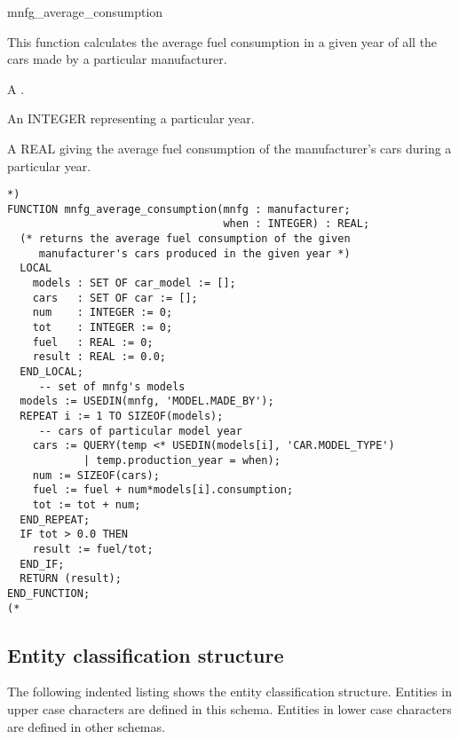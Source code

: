 \documentclass{article}
\begin{document}
\begin{Mnamedesc}{mnfg_average_consumption}
\begin{Mdesctext}
    This function calculates the average fuel consumption in a given year
of all the cars made by a particular manufacturer.
\end{Mdesctext}

\begin{Ipars}

\item[mnfg:] A .

\item[when:] An INTEGER representing a particular year.

\item[RESULT:] A REAL giving the average fuel consumption of the manufacturer's
cars during a particular year.
\end{Ipars}

\begin{Mexp}
\begin{verbatim}
*)
FUNCTION mnfg_average_consumption(mnfg : manufacturer;
                                  when : INTEGER) : REAL;
  (* returns the average fuel consumption of the given
     manufacturer's cars produced in the given year *)
  LOCAL
    models : SET OF car_model := [];
    cars   : SET OF car := [];
    num    : INTEGER := 0;
    tot    : INTEGER := 0;
    fuel   : REAL := 0;
    result : REAL := 0.0;
  END_LOCAL;
     -- set of mnfg's models
  models := USEDIN(mnfg, 'MODEL.MADE_BY');
  REPEAT i := 1 TO SIZEOF(models);
     -- cars of particular model year
    cars := QUERY(temp <* USEDIN(models[i], 'CAR.MODEL_TYPE')
            | temp.production_year = when);
    num := SIZEOF(cars);
    fuel := fuel + num*models[i].consumption;
    tot := tot + num;
  END_REPEAT;
  IF tot > 0.0 THEN
    result := fuel/tot;
  END_IF;
  RETURN (result);
END_FUNCTION;
(*
\end{verbatim}
\end{Mexp}
\end{Mnamedesc}

\subsection{Entity classification structure}

The following indented listing shows the entity classification structure.
Entities in upper case characters are defined in this schema. Entities in
lower case characters are defined in other schemas.
\end{document}
